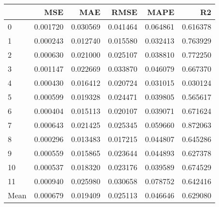 \begin{tabular}{lrrrrr}
\toprule
 & MSE & MAE & RMSE & MAPE & R2 \\
\midrule
0 & 0.001720 & 0.030569 & 0.041464 & 0.064861 & 0.616378 \\
1 & 0.000243 & 0.012740 & 0.015580 & 0.032413 & 0.763929 \\
2 & 0.000630 & 0.021000 & 0.025107 & 0.038810 & 0.772250 \\
3 & 0.001147 & 0.022669 & 0.033870 & 0.046079 & 0.667370 \\
4 & 0.000430 & 0.016412 & 0.020724 & 0.031015 & 0.030124 \\
5 & 0.000599 & 0.019328 & 0.024471 & 0.039805 & 0.565617 \\
6 & 0.000404 & 0.015113 & 0.020107 & 0.039071 & 0.671624 \\
7 & 0.000643 & 0.021425 & 0.025345 & 0.059660 & 0.872063 \\
8 & 0.000296 & 0.013483 & 0.017215 & 0.044807 & 0.645286 \\
9 & 0.000559 & 0.015865 & 0.023644 & 0.044893 & 0.627378 \\
10 & 0.000537 & 0.018320 & 0.023176 & 0.039589 & 0.674529 \\
11 & 0.000940 & 0.025980 & 0.030658 & 0.078752 & 0.642416 \\
Mean & 0.000679 & 0.019409 & 0.025113 & 0.046646 & 0.629080 \\
\bottomrule
\end{tabular}
